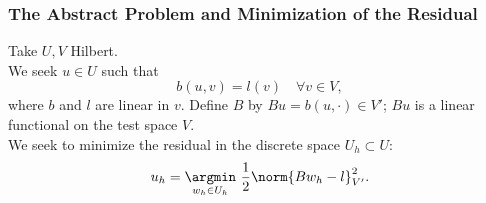  
 \begin{frame}
 \frametitle{The Abstract Problem and Minimization of the Residual}
 Take $U,V$ Hilbert.\\
 \vspace{5mm}
 We seek $u \in U$ such that
 \[
 b(u,v) = l(v) \quad \forall v \in V,
 \]
 where $b$ and $l$ are linear in $v$.  Define $B$ by $Bu = b(u,\cdot) \in V'$; $Bu$ is a linear functional on the test space $V$.\\
 \vspace{5mm}
 We seek to minimize the residual in the discrete space $U_{h} \subset U$:
 \begin{align*}
 u_{h} = \underset{w_{h} \in U_{h}} \argmin \,\, \frac{1}{2} \norm{Bw_{h}-l}_{V'}^{2}.
 \end{align*}
 \end{frame}
 \begin{comment}
 Let's first develop the abstract theory of DPG before applying it to the
 convection diffusion equation and then modifying it to enforce local
 conservation. These next couple slides should look familiar, I borrowed them
 from Nate.
 
 Start with two Hilbert spaces. Our problem seeks a solution u in Hilbert space
 U that satisfies this bilinear form for all test functions in V. Now define
 operator B: U -> V' through the bilinear form. Our problem can then be
 thought of as minimizing a residual in the dual space of V.
 \end{comment}
 
